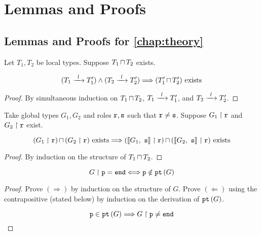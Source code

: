 \chapter{Lemmas and Proofs}

\section{Lemmas and Proofs for \cref{chap:theory}}
\label{section:proofs}

\begin{lemma}
Let $T_1, T_2$ be local types.
Suppose ${T_1}\,{\sqcap}\,{T_2}$ exists.

\[
(\treduce{T_1}{T'_1}{l}) \wedge (\treduce{T_2}{T'_2}{l})
	\Longrightarrow
(\tmerge{T'_1}{T'_2}) \text{ exists}
\]

\label{lem:localltspreservemerge}
\end{lemma}

\begin{proof}
By simultaneous induction on
${T_1}\,{\sqcap}\,{T_2}$, $\treduce{T_1}{T'_1}{l}$,
and $\treduce{T_2}{T'_2}{l}$.

\end{proof}

\begin{lemma}
Take global types $G_1, G_2$
and roles ${\mathtt{r}}, {\mathtt{s}}$ such that ${\mathtt{r}} \neq {\mathtt{s}}$.
Suppose ${G_1} \upharpoonright {\mathtt{r}}$ and ${G_2} \upharpoonright {\mathtt{r}}$ exist.

\[
{({G_1} \upharpoonright {\mathtt{r}})}\,{\sqcap}\,{({G_2} \upharpoonright {\mathtt{r}})} \text{ exists}
	\Longrightarrow
{( { \llbracket {G_1},~ {\mathtt{s}}  \rrbracket } \upharpoonright {\mathtt{r}}  )}\,{\sqcap}\,{({\llbracket {G_2},~{\mathtt{s}} \rrbracket} \upharpoonright {\mathtt{r}})} 
	\text{ exists}
\]

\label{lem:encglobalpreservemerge}
\end{lemma}

\begin{proof}
By induction on the structure of ${T_1}\,{\sqcap}\,{T_2}$.

\end{proof}

\begin{lemma}

\[
{G} \upharpoonright {\mathtt{p}} = \textnormal{\texttt{end}} \Longleftrightarrow {\mathtt{p}} \notin {\textnormal{\texttt{pt}}\left({G}\right)}
\]

\label{lem:projpt}
\end{lemma}

\begin{proof} 
Prove $(\Longrightarrow)$ by induction on the structure of $G$.
Prove $(\Longleftarrow)$ using the contrapositive (stated below)
by induction on the derivation of ${\textnormal{\texttt{pt}}\left({G}\right)}$.

\[
{\mathtt{p}} \in {\textnormal{\texttt{pt}}\left({G}\right)} \Longrightarrow {G} \upharpoonright {\mathtt{p}} \neq \textnormal{\texttt{end}}
\]
\end{proof}

